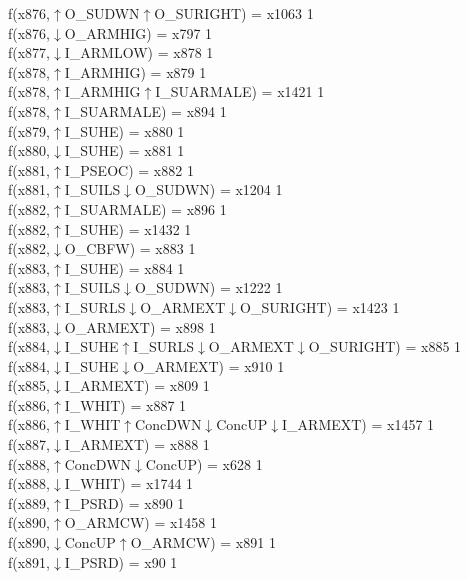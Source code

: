 f(x876,$\uparrow$O\_SUDWN$\uparrow$O\_SURIGHT) = x1063 {1} \\
f(x876,$\downarrow$O\_ARMHIG) = x797 {1} \\
f(x877,$\downarrow$I\_ARMLOW) = x878 {1} \\
f(x878,$\uparrow$I\_ARMHIG) = x879 {1} \\
f(x878,$\uparrow$I\_ARMHIG$\uparrow$I\_SUARMALE) = x1421 {1} \\
f(x878,$\uparrow$I\_SUARMALE) = x894 {1} \\
f(x879,$\uparrow$I\_SUHE) = x880 {1} \\
f(x880,$\downarrow$I\_SUHE) = x881 {1} \\
f(x881,$\uparrow$I\_PSEOC) = x882 {1} \\
f(x881,$\uparrow$I\_SUILS$\downarrow$O\_SUDWN) = x1204 {1} \\
f(x882,$\uparrow$I\_SUARMALE) = x896 {1} \\
f(x882,$\uparrow$I\_SUHE) = x1432 {1} \\
f(x882,$\downarrow$O\_CBFW) = x883 {1} \\
f(x883,$\uparrow$I\_SUHE) = x884 {1} \\
f(x883,$\uparrow$I\_SUILS$\downarrow$O\_SUDWN) = x1222 {1} \\
f(x883,$\uparrow$I\_SURLS$\downarrow$O\_ARMEXT$\downarrow$O\_SURIGHT) = x1423 {1} \\
f(x883,$\downarrow$O\_ARMEXT) = x898 {1} \\
f(x884,$\downarrow$I\_SUHE$\uparrow$I\_SURLS$\downarrow$O\_ARMEXT$\downarrow$O\_SURIGHT) = x885 {1} \\
f(x884,$\downarrow$I\_SUHE$\downarrow$O\_ARMEXT) = x910 {1} \\
f(x885,$\downarrow$I\_ARMEXT) = x809 {1} \\
f(x886,$\uparrow$I\_WHIT) = x887 {1} \\
f(x886,$\uparrow$I\_WHIT$\uparrow$ConcDWN$\downarrow$ConcUP$\downarrow$I\_ARMEXT) = x1457 {1} \\
f(x887,$\downarrow$I\_ARMEXT) = x888 {1} \\
f(x888,$\uparrow$ConcDWN$\downarrow$ConcUP) = x628 {1} \\
f(x888,$\downarrow$I\_WHIT) = x1744 {1} \\
f(x889,$\uparrow$I\_PSRD) = x890 {1} \\
f(x890,$\uparrow$O\_ARMCW) = x1458 {1} \\
f(x890,$\downarrow$ConcUP$\uparrow$O\_ARMCW) = x891 {1} \\
f(x891,$\downarrow$I\_PSRD) = x90 {1} \\
